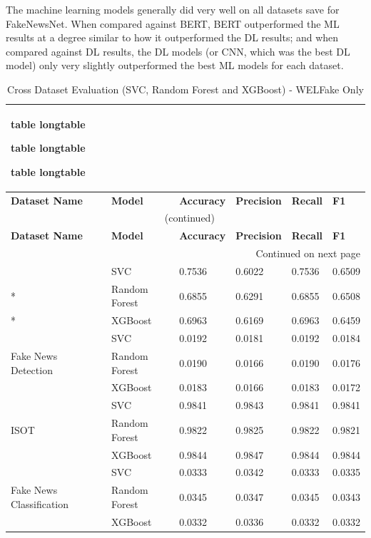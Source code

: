 \documentclass[stu,12pt,floatsintext,donotrepeattitle]{apa7}
\makeatletter
\let\origcaption\caption
\newcommand{\@tabletype}{table}
\newcommand{\@longtabletype}{longtable}
\DeclareRobustCommand{\caption}[2][]{%
    \ifx\relax#1\relax
      \origcaption{#2}%
      \def\temp@cap{#2}%
    \else
      \origcaption[#1]{#2}%
      \def\temp@cap{#1}%
    \fi
    \ifx\@captype\@tabletype
      \ifx\@currenvir\@longtabletype\else
        \addcontentsline{lot}{table}{\protect\numberline{\thetable}{\ignorespaces\temp@cap}}%
      \fi
    \fi
  }%
\let\oldcaption\caption
\renewcommand{\caption}[2][]{%
    \oldcaption[#1]{#2}%
    \vspace{-12pt}%
  }%
\makeatother
\begin{document}
The machine learning models generally did very well on all datasets save for FakeNewsNet. When compared against BERT, BERT outperformed the ML results at a degree similar to how it outperformed the DL results; and when compared against DL results, the DL models (or CNN, which was the best DL model) only very slightly outperformed the best ML models for each dataset.

\vspace{25pt}

\begingroup
\setlength{\tabcolsep}{3pt}
\renewcommand{\arraystretch}{1.3}
\setlength\LTleft{\fill}
\setlength\LTright{\fill}
\begin{longtable}{@{} p{4.7cm} p{3.2cm} p{1.7cm} p{1.7cm} p{1.7cm} p{1.7cm} @{}}
\caption{Cross Dataset Evaluation (SVC, Random Forest and XGBoost) - WELFake Only} \label{tab:ml_cross_results} \\
\toprule
\textbf{Dataset Name} & \textbf{Model} & \textbf{Accuracy} & \textbf{Precision} & \textbf{Recall} & \textbf{F1} \\
\midrule
\endfirsthead

\multicolumn{6}{c}{\normalsize\tablename\ \thetable{} (continued)} \\
\toprule
\textbf{Dataset Name} & \textbf{Model} & \textbf{Accuracy} & \textbf{Precision} & \textbf{Recall} & \textbf{F1} \\
\midrule
\endhead

\bottomrule
\multicolumn{6}{r}{{Continued on next page}} \\
\endfoot

\bottomrule
\endlastfoot
\multirow{3}{*}{FakeNewsNet} & SVC & 0.7536 & 0.6022 & 0.7536 & 0.6509 \\*
 & Random Forest & 0.6855 & 0.6291 & 0.6855 & 0.6508 \\*
 & XGBoost & 0.6963 & 0.6169 & 0.6963 & 0.6459 \\
\midrule
\multirow{3}{*}{Fake News Detection} & SVC & 0.0192 & 0.0181 & 0.0192 & 0.0184 \\*
 & Random Forest & 0.0190 & 0.0166 & 0.0190 & 0.0176 \\*
 & XGBoost & 0.0183 & 0.0166 & 0.0183 & 0.0172 \\
\midrule
\multirow{3}{*}{ISOT} & SVC & 0.9841 & 0.9843 & 0.9841 & 0.9841 \\*
 & Random Forest & 0.9822 & 0.9825 & 0.9822 & 0.9821 \\*
 & XGBoost & 0.9844 & 0.9847 & 0.9844 & 0.9844 \\
\midrule
\multirow{3}{*}{Fake News Classification} & SVC & 0.0333 & 0.0342 & 0.0333 & 0.0335 \\*
 & Random Forest & 0.0345 & 0.0347 & 0.0345 & 0.0343 \\*
 & XGBoost & 0.0332 & 0.0336 & 0.0332 & 0.0332 \\
\bottomrule
\end{longtable}
\endgroup
\end{document}
